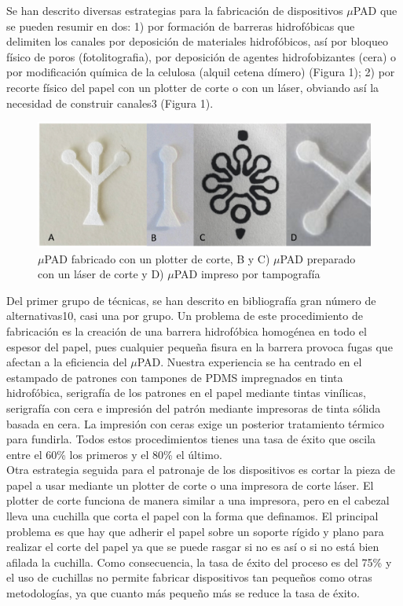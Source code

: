 \documentclass{article}
\begin{document}
Se han descrito diversas estrategias para la fabricación de dispositivos $\mu$PAD que se pueden resumir en dos: 1) por formación de barreras hidrofóbicas que delimiten los canales por deposición de materiales hidrofóbicos, así por bloqueo físico de poros (fotolitografia), por deposición de agentes hidrofobizantes (cera) o por modificación química de la celulosa (alquil cetena dímero) (Figura 1); 2) por recorte físico del papel con un plotter de corte o con un láser, obviando así la necesidad de construir canales3 (Figura 1).\\





\begin{figure}[h]
\includegraphics{papel.ps}
\caption{ $\mu$PAD fabricado con un plotter de corte, B y C) $\mu$PAD preparado con un láser de corte y D) $\mu$PAD impreso por tampografía}
\label{fig:papel}
\end{figure}

Del primer grupo de técnicas, se han descrito en bibliografía gran número de alternativas10, casi una por grupo. Un problema de este procedimiento de fabricación es la creación de una barrera hidrofóbica homogénea en todo el espesor del papel, pues cualquier pequeña fisura en la barrera provoca fugas que afectan a la eficiencia del $\mu$PAD. Nuestra experiencia se ha centrado en el estampado de patrones con tampones de PDMS impregnados en tinta hidrofóbica, serigrafía de los patrones en el papel mediante tintas vinílicas, serigrafía con cera e impresión del patrón mediante impresoras de tinta sólida basada en cera\cite{Lopez-Ruiz2014}. La impresión con ceras exige un posterior tratamiento térmico para fundirla. Todos estos procedimientos tienes una tasa de éxito que oscila entre el 60\% los primeros y el 80\% el último.\\ 

Otra estrategia seguida para el patronaje de los dispositivos es cortar la pieza de papel a usar mediante un plotter de corte o una impresora de corte láser. El plotter de corte funciona de manera similar a una impresora, pero en el cabezal lleva una cuchilla que corta el papel con la forma que definamos. El principal problema es que hay que adherir el papel sobre un soporte rígido y plano para realizar el corte del papel ya que se puede rasgar si no es así o si no está bien afilada la cuchilla. Como consecuencia, la tasa de éxito del proceso es del 75\% y el uso de cuchillas no permite fabricar dispositivos tan pequeños como otras metodologías, ya que cuanto más pequeño más se reduce la tasa de éxito.\\ 
\end{document}
